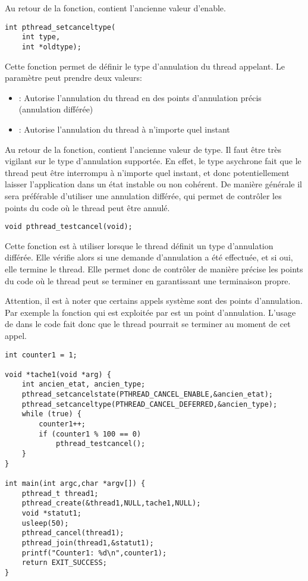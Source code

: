 Au retour de la fonction,  contient l'ancienne valeur d'enable.


\label{func:pthread_setcanceltype}

\begin{lstlisting}
int pthread_setcanceltype(
	int type,
	int *oldtype);
\end{lstlisting}
Cette fonction permet de définir le type d'annulation du thread appelant. Le paramètre  peut prendre deux valeurs:
\begin{itemize}
	\item {}: Autorise l'annulation du thread en des points d'annulation précis (annulation différée)
	\item {}: Autorise l'annulation du thread à n'importe quel instant
\end{itemize}

Au retour de la fonction,  contient l'ancienne valeur de type. Il faut \^etre très vigilant sur le type d'annulation supportée. En effet, le type asychrone fait que le thread peut \^etre interrompu à n'importe quel instant, et donc potentiellement laisser l'application dans un état instable ou non cohérent. De manière générale il sera préférable d'utiliser une annulation différée, qui permet de contrôler les points du code où le thread peut être annulé.


\label{func:pthread_testcancel}

\begin{lstlisting}
void pthread_testcancel(void);
\end{lstlisting}

Cette fonction est à utiliser lorsque le thread définit un type d'annulation différée. Elle vérifie alors si une demande d'annulation a été effectuée, et si oui, elle termine le thread. Elle permet donc de contr\^oler de manière précise les points du code o\`u le thread peut se terminer en garantissant une terminaison propre.

Attention, il est à noter que certains appels système sont des points d'annulation. Par exemple la fonction  qui est exploitée par  est un point d'annulation. L'usage de  dans le code fait donc que le thread pourrait se terminer au moment de cet appel.



\begin{lstlisting}
int counter1 = 1;

void *tache1(void *arg) {
    int ancien_etat, ancien_type;
    pthread_setcancelstate(PTHREAD_CANCEL_ENABLE,&ancien_etat);
    pthread_setcanceltype(PTHREAD_CANCEL_DEFERRED,&ancien_type);
    while (true) {
        counter1++;
        if (counter1 % 100 == 0)
            pthread_testcancel();
    }
}

int main(int argc,char *argv[]) {
    pthread_t thread1;
    pthread_create(&thread1,NULL,tache1,NULL);
    void *statut1;
    usleep(50);
    pthread_cancel(thread1);
    pthread_join(thread1,&statut1);
    printf("Counter1: %d\n",counter1);
    return EXIT_SUCCESS;
}
\end{lstlisting}

